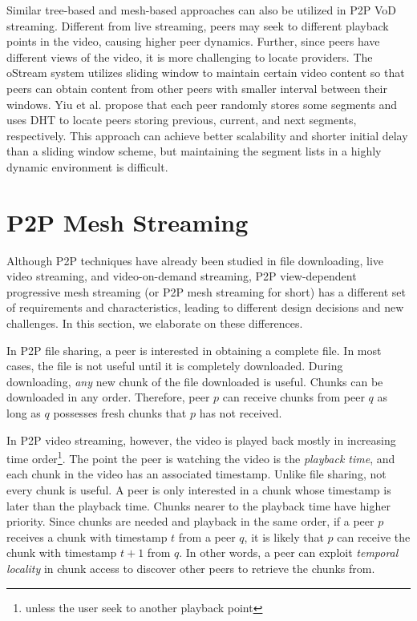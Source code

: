 Similar tree-based and mesh-based approaches can also be utilized in
P2P VoD streaming. Different from live streaming, peers
may seek to different playback points in the video, causing
higher peer dynamics. 
Further, since peers have different views of the video, it is more challenging
to locate providers. The oStream \cite{cui:ostream} system
utilizes sliding window to maintain certain video content so that
peers can obtain content from other peers with smaller interval
between their windows. Yiu et al. \cite{yiu:distributed} propose that
each peer randomly stores some segments and uses DHT to locate peers
storing previous, current, and next segments, respectively. This
approach can achieve better scalability and shorter initial delay than
a sliding window scheme, but maintaining the segment
lists in a highly dynamic environment is difficult.
   
\section{P2P Mesh Streaming}
\label{s:comp}

    Although P2P techniques have already been studied in
    file downloading, live video streaming, and
    video-on-demand streaming, P2P view-dependent
    progressive mesh streaming (or P2P mesh streaming for
    short) has a different set of requirements and
    characteristics, leading to different design decisions and
    new challenges.
    In this section, we elaborate on these differences.

    In P2P file sharing, a peer is interested in obtaining a
    complete file.  In most cases, the file is not useful
    until it is completely downloaded.  During downloading,
    \textit{any} new chunk of the file downloaded is useful.
    Chunks can be downloaded in any order.
    Therefore, peer $p$ can receive chunks from peer $q$ as
    long as $q$ possesses fresh chunks that $p$ has
    not received.

    In P2P video streaming, however, the video is played
    back mostly in increasing time order\footnote{unless the
    user seek to another playback point}.  The point the
    peer is watching the video is the \textit{playback
    time}, and each chunk in the video has an associated
    timestamp.  Unlike file sharing, not every chunk is
    useful.  A peer is only interested in a chunk whose
    timestamp is later than the playback time.  Chunks
    nearer to the playback time have higher priority.  
    Since chunks are
    needed and playback in the same order, if a peer $p$
    receives a chunk with timestamp $t$ from a peer $q$, it
    is likely that $p$ can receive the chunk with timestamp
    $t+1$ from $q$.  In other words, a peer can exploit
    \textit{temporal locality} in chunk access to discover
    other peers to retrieve the chunks from.

